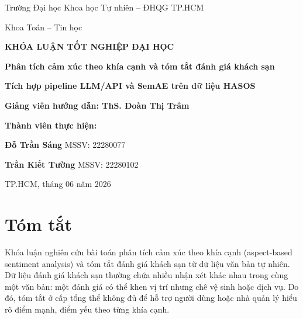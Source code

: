 \documentclass[12pt,a4paper]{report}
\newcommand{\universityname}{Trường Đại học Khoa học Tự nhiên -- ĐHQG TP.HCM}
\newcommand{\facultyname}{Khoa Toán -- Tin học}
\newcommand{\advisorname}{ThS. Đoàn Thị Trâm}
\newcommand{\reporttitle}{Phân tích cảm xúc theo khía cạnh và tóm tắt đánh giá khách sạn}
\newcommand{\cityname}{TP.HCM}
\newcommand{\reportyear}{2026}
\begin{document}
\begin{titlepage}
    \centering
    {\Large \universityname \par}
    \vspace{0.2cm}
    {\Large \facultyname \par}

    \vspace{2.0cm}
    {\LARGE \bfseries KHÓA LUẬN TỐT NGHIỆP ĐẠI HỌC\par}

    \vspace{1.0cm}
    {\Huge \bfseries \reporttitle \par}

    \vspace{0.8cm}
    {\Large \bfseries Tích hợp pipeline LLM/API và SemAE trên dữ liệu HASOS\par}

    \vspace{1.5cm}
    {\Large \bfseries Giảng viên hướng dẫn: \advisorname \par}

    \vspace{1.4cm}
    {\Large \bfseries Thành viên thực hiện:\par}
    \vspace{0.4cm}
    {\large
    \textbf{Đỗ Trần Sáng} \hspace{0.5cm} MSSV: 22280077\par
    \vspace{0.2cm}
    \textbf{Trần Kiết Tường} \hspace{0.5cm} MSSV: 22280102\par
    }

    \vfill
    {\large \cityname, tháng 06 năm \reportyear \par}
\end{titlepage}

\chapter*{Tóm tắt}

Khóa luận nghiên cứu bài toán phân tích cảm xúc theo khía cạnh (aspect-based sentiment analysis) và tóm tắt đánh giá khách sạn từ dữ liệu văn bản tự nhiên. Dữ liệu đánh giá khách sạn thường chứa nhiều nhận xét khác nhau trong cùng một văn bản: một đánh giá có thể khen vị trí nhưng chê vệ sinh hoặc dịch vụ. Do đó, tóm tắt ở cấp tổng thể không đủ để hỗ trợ người dùng hoặc nhà quản lý hiểu rõ điểm mạnh, điểm yếu theo từng khía cạnh.
\end{document}
